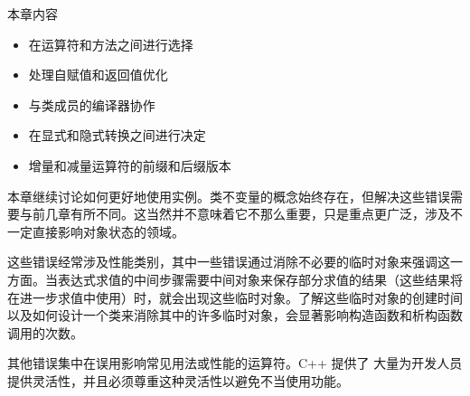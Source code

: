 本章内容

\begin{itemize}
\item
在运算符和方法之间进行选择

\item
处理自赋值和返回值优化

\item
与类成员的编译器协作

\item
在显式和隐式转换之间进行决定

\item
增量和减量运算符的前缀和后缀版本
\end{itemize}

本章继续讨论如何更好地使用实例。类不变量的概念始终存在，但解决这些错误需要与前几章有所不同。这当然并不意味着它不那么重要，只是重点更广泛，涉及不一定直接影响对象状态的领域。

这些错误经常涉及性能类别，其中一些错误通过消除不必要的临时对象来强调这一方面。当表达式求值的中间步骤需要中间对象来保存部分求值的结果（这些结果将在进一步求值中使用）时，就会出现这些临时对象。了解这些临时对象的创建时间以及如何设计一个类来消除其中的许多临时对象，会显著影响构造函数和析构函数调用的次数。

其他错误集中在误用影响常见用法或性能的运算符。C++ 提供了 大量为开发人员提供灵活性，并且必须尊重这种灵活性以避免不当使用功能。
